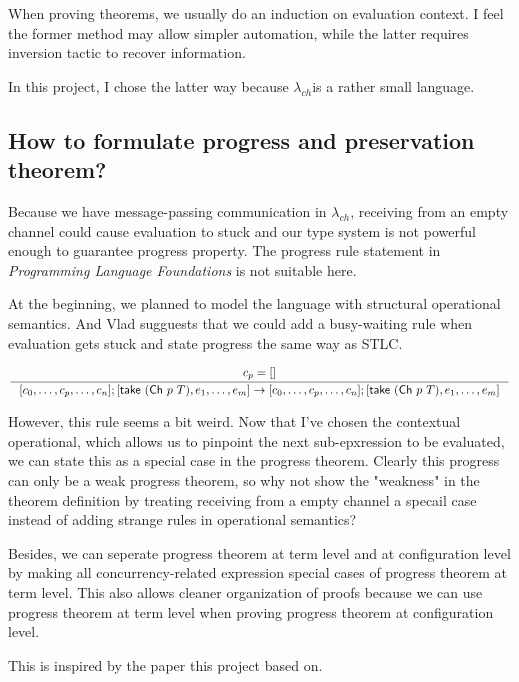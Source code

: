 \documentclass{article}
\newcommand{\lambdach}{$\lambda_{ch}$}
\newcommand{\sco}[1]{\textsf{#1}}
\newcommand{\take}[1]{\sco{take } #1}
\newcommand{\channel}[2]{\sco{Ch }#1\ #2}
\begin{document}
When proving theorems, we usually do an induction on evaluation context. I feel the former method may allow simpler
automation, while the latter requires \sco{inversion} tactic to recover information.

In this project, I chose the latter way because \lambdach is a rather small language.

\subsection{How to formulate progress and preservation theorem?}

Because we have message-passing communication in \lambdach, receiving from an empty channel could cause
evaluation to stuck and our type system is not powerful enough to guarantee progress property.
The progress rule statement in \textit{Programming Language Foundations} is not
suitable here.

At the beginning, we planned to model the language with structural operational semantics.
And Vlad sugguests that we could add a busy-waiting rule when evaluation gets stuck and state
progress the same way as STLC.

\begin{gather*}
    \inference{
        c_p = []
    }{
        [c_0,\dots,c_p,\dots,c_n];[\take{(\channel{p}{T})},e_1,\dots,e_m] ->
        [c_0,\dots,c_p,\dots,c_n];[\take{(\channel{p}{T})},e_1,\dots,e_m]
    }
\end{gather*}

However, this rule seems a bit weird. Now that I've chosen the contextual operational, which allows us to
pinpoint the next sub-epxression to be evaluated, we can state this as a special case in the progress theorem.
Clearly this progress can only be a weak progress theorem, so why not show the "weakness" in the theorem
definition by treating receiving from a empty channel a specail case instead of adding strange rules in operational
semantics?

Besides, we can seperate progress theorem at term level and at configuration level by making all
concurrency-related expression special cases of progress theorem at term level. This also allows cleaner
organization of proofs because we can use progress theorem at term level when proving progress theorem at
configuration level.

This is inspired by the paper\cite{fowler2019typed} this project based on.

\end{document}
